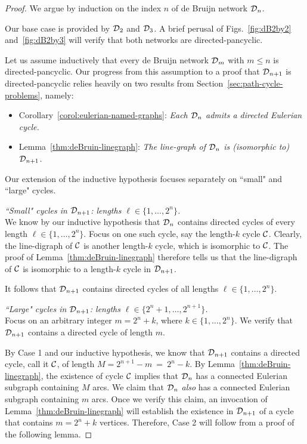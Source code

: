 \begin{proof}
We argue by induction on the index $n$ of de Bruijn network $\mbox{$\cal D$}_n$.

Our base case is provided by $\mbox{$\cal D$}_2$ and $\mbox{$\cal D$}_3$.  A brief perusal of Figs.~\ref{fig:dB2by2} 
and~\ref{fig:dB2by3} will verify that both networks are directed-pancyclic.

Let us assume inductively that every de Bruijn network $\mbox{$\cal D$}_m$ with $m \leq n$ is 
directed-pancyclic.  Our progress from this assumption to a proof that $\mbox{$\cal D$}_{n+1}$ is 
directed-pancyclic relies heavily on two results from Section~\ref{sec:path-cycle-problems}, 
namely:
\begin{itemize}
\item
Corollary~\ref{corol:eulerian-named-graphs}: {\em Each $\mbox{$\cal D$}_n$ admits a directed Eulerian cycle.}
\item
Lemma~\ref{thm:deBruin-linegraph}: {\em The line-graph of $\mbox{$\cal D$}_n$ is (isomorphic to) $\mbox{$\cal D$}_{n+1}$.}
\end{itemize}
Our extension of the inductive hypothesis focuses separately on ``small"  and ``large" cycles.

\medskip

  {\em ``Small" cycles in $\mbox{$\cal D$}_{n+1}$: lengths $\ell \in \{1, \ldots, 2^n\}$.} \\
We know by our inductive hypothesis that $\mbox{$\cal D$}_n$ contains directed cycles of every length
$\ell \in \{1, \ldots, 2^n\}$.  Focus on one such cycle, say the length-$k$ cycle $\mbox{$\cal C$}$.  Clearly,
the line-digraph of $\mbox{$\cal C$}$ is another length-$k$ cycle, which is isomorphic to $\mbox{$\cal C$}$.  The proof of
Lemma~\ref{thm:deBruin-linegraph} therefore tells us that the line-digraph of $\mbox{$\cal C$}$ is
isomorphic to a length-$k$ cycle in $\mbox{$\cal D$}_{n+1}$.

It follows that $\mbox{$\cal D$}_{n+1}$ contains directed cycles of all lengths $\ell \in \{1, \ldots, 2^n\}$.

\medskip

 {\em ``Large" cycles in $\mbox{$\cal D$}_{n+1}$: lengths $\ell \in \{2^n+ 1, \ldots, 2^{n+1}\}$.} \\
Focus on an arbitrary integer $m = 2^n +k$, where $k \in \{1, \ldots, 2^n\}$.  We verify that $\mbox{$\cal D$}_{n+1}$
contains a directed cycle of length $m$.

By Case 1 and our inductive hypothesis, we know that $\mbox{$\cal D$}_{n+1}$ contains a directed cycle, call
it $\mbox{$\cal C$}$, of length $M = 2^{n+1} - m \ = \ 2^n -k$.  By Lemma~\ref{thm:deBruin-linegraph}, the
existence  of cycle $\mbox{$\cal C$}$ implies that $\mbox{$\cal D$}_n$ has a connected Eulerian subgraph
containing $M$ arcs.  We claim that $\mbox{$\cal D$}_n$ {\em also} has a connected Eulerian subgraph
containing $m$ arcs.  Once we verify this claim, an invocation of
Lemma~\ref{thm:deBruin-linegraph} will establish the existence in $\mbox{$\cal D$}_{n+1}$ of a cycle that
contains $m = 2^n +k$ vertices.  Therefore, Case 2 will follow from a proof of the following lemma.


\end{proof}
